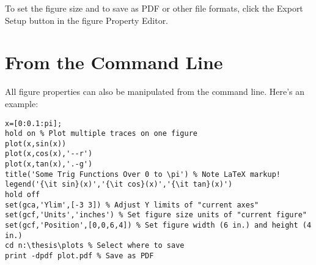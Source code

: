 \documentclass[letterpaper,12pt,titlepage,oneside,final]{report}
\begin{document}
To set the figure size and to save as PDF or other file formats, click the Export Setup button in the figure Property Editor.

\section{From the Command Line} 
All figure properties can also be manipulated from the command line. Here's an example: 
\begin{verbatim}
x=[0:0.1:pi];
hold on % Plot multiple traces on one figure
plot(x,sin(x))
plot(x,cos(x),'--r')
plot(x,tan(x),'.-g')
title('Some Trig Functions Over 0 to \pi') % Note LaTeX markup!
legend('{\it sin}(x)','{\it cos}(x)','{\it tan}(x)')
hold off
set(gca,'Ylim',[-3 3]) % Adjust Y limits of "current axes"
set(gcf,'Units','inches') % Set figure size units of "current figure"
set(gcf,'Position',[0,0,6,4]) % Set figure width (6 in.) and height (4 in.)
cd n:\thesis\plots % Select where to save
print -dpdf plot.pdf % Save as PDF
\end{verbatim}


\renewcommand{\bibname}{References}




\nocite{*}
\end{document}
